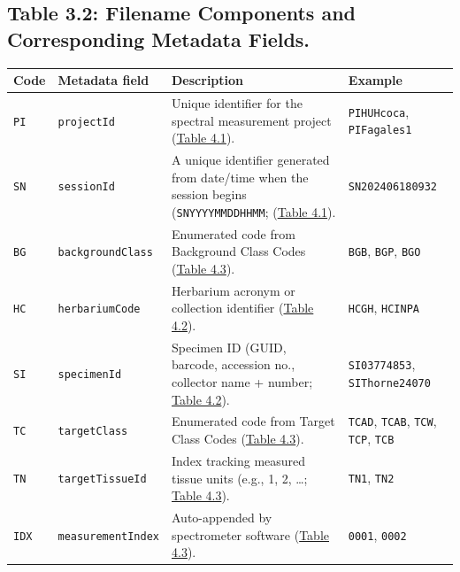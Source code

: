\documentclass[
  letterpaper,
  DIV=11,
  numbers=noendperiod]{scrreprt}
\begin{document}
\subsection{Table 3.2: Filename Components and Corresponding Metadata
Fields.}\label{tbl-3-2}

\begin{longtable}[]{@{}
  >{\raggedright\arraybackslash}p{}
  >{\raggedright\arraybackslash}p{}
  >{\raggedright\arraybackslash}p{}
  >{\raggedright\arraybackslash}p{}@{}}
\toprule\noalign{}
\begin{minipage}[b]{\linewidth}\raggedright
Code
\end{minipage} & \begin{minipage}[b]{\linewidth}\raggedright
Metadata field
\end{minipage} & \begin{minipage}[b]{\linewidth}\raggedright
Description
\end{minipage} & \begin{minipage}[b]{\linewidth}\raggedright
Example
\end{minipage} \\
\midrule\noalign{}
\endhead
\bottomrule\noalign{}
\endlastfoot
\texttt{PI} & \texttt{projectId} & Unique identifier for the spectral
measurement project (\hyperref[tbl-4-1]{Table 4.1}). &
\texttt{PIHUHcoca}, \texttt{PIFagales1} \\
\texttt{SN} & \texttt{sessionId} & A unique identifier generated from
date/time when the session begins (\texttt{SNYYYYMMDDHHMM};
(\hyperref[tbl-4-1]{Table 4.1}). & \texttt{SN202406180932} \\
\texttt{BG} & \texttt{backgroundClass} & Enumerated code from Background
Class Codes (\hyperref[tbl-4-3]{Table 4.3}). & \texttt{BGB},
\texttt{BGP}, \texttt{BGO} \\
\texttt{HC} & \texttt{herbariumCode} & Herbarium acronym or collection
identifier (\hyperref[tbl-4-2]{Table 4.2}). & \texttt{HCGH},
\texttt{HCINPA} \\
\texttt{SI} & \texttt{specimenId} & Specimen ID (GUID, barcode,
accession no., collector name + number; \hyperref[tbl-4-2]{Table 4.2}).
& \texttt{SI03774853}, \texttt{SIThorne24070} \\
\texttt{TC} & \texttt{targetClass} & Enumerated code from Target Class
Codes (\hyperref[tbl-4-3]{Table 4.3}). & \texttt{TCAD}, \texttt{TCAB},
\texttt{TCW}, \texttt{TCP}, \texttt{TCB} \\
\texttt{TN} & \texttt{targetTissueId} & Index tracking measured tissue
units (e.g., 1, 2, \ldots; \hyperref[tbl-4-3]{Table 4.3}). &
\texttt{TN1}, \texttt{TN2} \\
\texttt{IDX} & \texttt{measurementIndex} & Auto-appended by spectrometer
software (\hyperref[tbl-4-3]{Table 4.3}). & \texttt{0001},
\texttt{0002} \\
\end{longtable}
\end{document}
